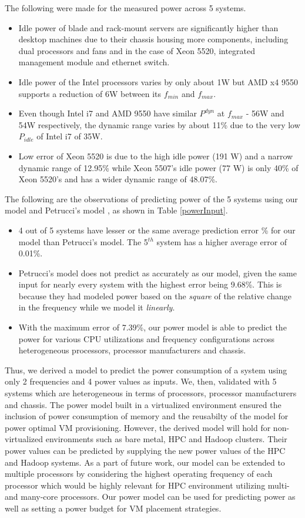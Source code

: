 \documentclass{sig-alternate}
\begin{document}
The following were made for the measured power across 5 systems. 
\begin{itemize}
\item Idle power of blade and rack-mount servers are significantly higher than desktop machines due to their chassis housing more components, including dual processors and fans and in the case of Xeon 5520, integrated management module and ethernet switch. 
 \item Idle power of the Intel processors varies by only about 1W but AMD x4 9550 supports a reduction of 6W between its $f_{min}$ and $f_{max}$.
\item Even though Intel i7 and AMD 9550 have similar $P^{dyn}$ at $f_{max}$ - 56W and 54W respectively, the dynamic range varies by about 11\% due to the very low $P_{idle}$ of Intel i7 of 35W. 
 \item Low error of Xeon 5520 is due to the high idle power (191 W) and a narrow dynamic range of 12.95\% while Xeon 5507's idle power (77 W) is only 40\% of Xeon 5520's and has a wider dynamic range of 48.07\%.
 \end{itemize}
The following are the observations of predicting power of the 5 systems using our model and Petrucci's model \cite{Petrucci2011}, as shown in Table \ref{powerInput}. \begin{itemize}
 \item 4 out of 5 systems have lesser or the same average prediction error \% for our model than Petrucci's model. The 5$^{th}$ system has a higher average error of 0.01\%. 
 \item Petrucci's model does not predict as accurately as our model, given the same input for nearly every system with the highest error being 9.68\%.  This is because they had modeled power based on the \emph{square} of the relative change in the frequency while we model it \emph{linearly}.
 \item With the maximum error of 7.39\%, our power model is able to predict the power for various CPU utilizations and frequency configurations across heterogeneous processors, processor manufacturers and chassis. 
\end{itemize}
Thus, we derived a model to predict the power consumption of a system using only 2 frequencies and 4 power values as inputs. We, then, validated with 5 systems which are heterogeneous in terms of processors, processor manufacturers and chassis. The power model built in a virtualized environment ensured the inclusion of power consumption of memory and the reusabilty of the model for power optimal VM provisioning. However, the derived model will hold for non-virtualized environments such as bare metal, HPC and Hadoop clusters. Their power values can be predicted by supplying the new power values of the HPC and Hadoop systems. As a part of future work, our model can be extended to multiple processors by considering the highest operating frequency of each processor which would be highly relevant for HPC environment utilizing multi- and many-core processors. Our power model can be used for predicting power as well as setting a power budget for VM placement strategies. 
\end{document}
